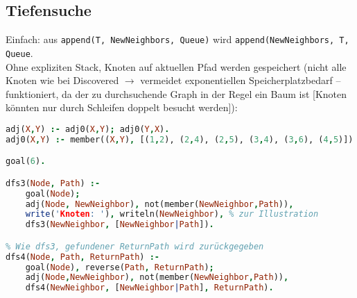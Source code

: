 \subsection{Tiefensuche}
Einfach: aus \lstinline`append(T, NewNeighbors, Queue)` wird \lstinline`append(NewNeighbors, T, Queue`.\\
Ohne expliziten Stack, Knoten auf aktuellen Pfad werden gespeichert (nicht alle Knoten wie bei Discovered $\to$ vermeidet exponentiellen Speicherplatzbedarf -- funktioniert, da der zu durchsuchende Graph in der Regel ein Baum ist [Knoten könnten nur durch Schleifen doppelt besucht werden]):
\begin{lstlisting}[language=Prolog]
% Adjazenzrelation des ungerichteten Graphen (nicht effizient)
adj(X,Y) :- adj0(X,Y); adj0(Y,X).
adj0(X,Y) :- member((X,Y), [(1,2), (2,4), (2,5), (3,4), (3,6), (4,5)]).

goal(6).

dfs3(Node, Path) :-
	goal(Node);
	adj(Node, NewNeighbor), not(member(NewNeighbor,Path)),
	write('Knoten: '), writeln(NewNeighbor), % zur Illustration
	dfs3(NewNeighbor, [NewNeighbor|Path]).

% Wie dfs3, gefundener ReturnPath wird zurückgegeben
dfs4(Node, Path, ReturnPath) :-
	goal(Node), reverse(Path, ReturnPath);
	adj(Node,NewNeighbor), not(member(NewNeighbor,Path)),
	dfs4(NewNeighbor, [NewNeighbor|Path], ReturnPath).
\end{lstlisting}




